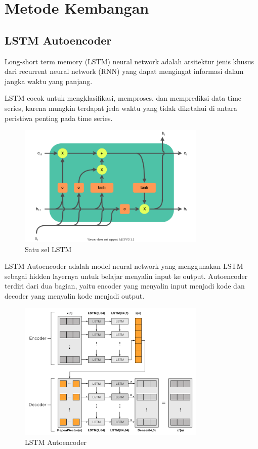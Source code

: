 \chapter{Metode Kembangan}

\section{LSTM Autoencoder}

Long-short term memory (LSTM) neural network adalah arsitektur jenis khusus dari recurrent neural network (RNN) yang dapat mengingat informasi dalam jangka waktu yang panjang.

LSTM cocok untuk mengklasifikasi, memproses, dan memprediksi data time series, karena mungkin terdapat jeda waktu yang tidak diketahui di antara peristiwa penting pada time series.

\begin{figure}[h]
    \centering
    \includegraphics[width=0.8\textwidth]{resources/LSTM/LSTM_cell.png}
    \caption{Satu sel LSTM}
\end{figure}

LSTM Autoencoder adalah model neural network yang menggunakan LSTM sebagai hidden layernya untuk belajar menyalin input ke output. Autoencoder terdiri dari dua bagian, yaitu encoder yang menyalin input menjadi kode dan decoder yang menyalin kode menjadi output.

\begin{figure}[h]
    \centering
    \includegraphics[width=0.8\textwidth]{resources/LSTM/lstm_ae.png}
    \caption{LSTM Autoencoder}
\end{figure}

